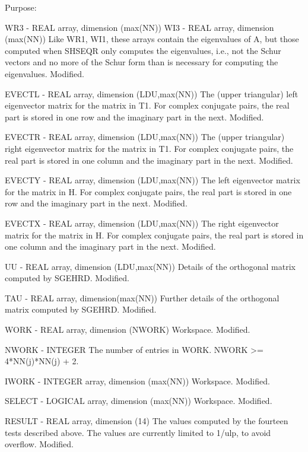 \begin{DoxyParagraph}{Purpose\+: }
\begin{DoxyVerb}
  WR3    - REAL array, dimension (max(NN))
  WI3    - REAL array, dimension (max(NN))
           Like WR1, WI1, these arrays contain the eigenvalues of A,
           but those computed when SHSEQR only computes the
           eigenvalues, i.e., not the Schur vectors and no more of the
           Schur form than is necessary for computing the
           eigenvalues.
           Modified.

  EVECTL - REAL array, dimension (LDU,max(NN))
           The (upper triangular) left eigenvector matrix for the
           matrix in T1.  For complex conjugate pairs, the real part
           is stored in one row and the imaginary part in the next.
           Modified.

  EVECTR - REAL array, dimension (LDU,max(NN))
           The (upper triangular) right eigenvector matrix for the
           matrix in T1.  For complex conjugate pairs, the real part
           is stored in one column and the imaginary part in the next.
           Modified.

  EVECTY - REAL array, dimension (LDU,max(NN))
           The left eigenvector matrix for the
           matrix in H.  For complex conjugate pairs, the real part
           is stored in one row and the imaginary part in the next.
           Modified.

  EVECTX - REAL array, dimension (LDU,max(NN))
           The right eigenvector matrix for the
           matrix in H.  For complex conjugate pairs, the real part
           is stored in one column and the imaginary part in the next.
           Modified.

  UU     - REAL array, dimension (LDU,max(NN))
           Details of the orthogonal matrix computed by SGEHRD.
           Modified.

  TAU    - REAL array, dimension(max(NN))
           Further details of the orthogonal matrix computed by SGEHRD.
           Modified.

  WORK   - REAL array, dimension (NWORK)
           Workspace.
           Modified.

  NWORK  - INTEGER
           The number of entries in WORK.  NWORK >= 4*NN(j)*NN(j) + 2.

  IWORK  - INTEGER array, dimension (max(NN))
           Workspace.
           Modified.

  SELECT - LOGICAL array, dimension (max(NN))
           Workspace.
           Modified.

  RESULT - REAL array, dimension (14)
           The values computed by the fourteen tests described above.
           The values are currently limited to 1/ulp, to avoid
           overflow.
           Modified.


\end{DoxyVerb}
\end{DoxyParagraph}
